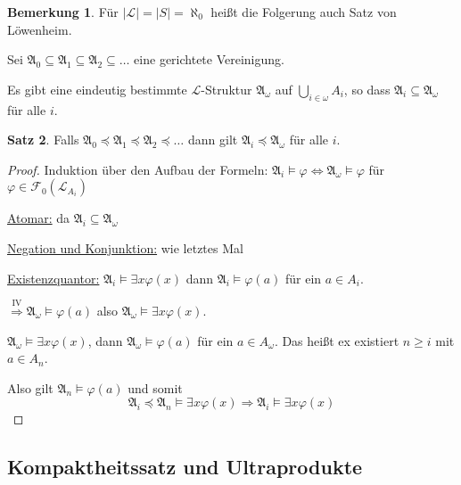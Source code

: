 \documentclass[12pt,parskip=full]{scrartcl}
\newcommand{\abs}[1]{{\left| #1 \right|}}
\newcommand{\heading}{\underline}
\theoremstyle{definition}
\newtheorem{theorem}{Satz}[section]
\newtheorem{remark}[theorem]{Bemerkung}
\begin{document}
	\begin{remark}
		Für $\abs{\mathcal{L}} = \abs{S} = \aleph_0$ heißt die Folgerung auch Satz von Löwenheim.
	\end{remark}

	Sei $\mathfrak{A}_0 \subseteq \mathfrak{A}_1 \subseteq \mathfrak{A}_2 \subseteq \dots$ eine gerichtete Vereinigung.
	
	Es gibt eine eindeutig bestimmte $\mathcal{L}$-Struktur $\mathfrak{A}_\omega$ auf $\bigcup_{i \in \omega} A_i$, so dass $\mathfrak{A}_i \subseteq \mathfrak{A}_\omega$ für alle $i$.
	
	\begin{theorem}
		Falls $\mathfrak{A}_0 \preccurlyeq \mathfrak{A}_1 \preccurlyeq \mathfrak{A}_2 \preccurlyeq \dots$ dann gilt $\mathfrak{A}_i \preccurlyeq \mathfrak{A}_\omega$ für alle $i$.
	\end{theorem}

	\begin{proof}
		Induktion über den Aufbau der Formeln: $\mathfrak{A}_i \models \varphi \Leftrightarrow \mathfrak{A}_\omega \models \varphi$ für $\varphi \in \mathcal{F}_0(\mathcal{L}_{A_i})$
		
		\heading{Atomar:} da $\mathfrak{A}_i \subseteq \mathfrak{A}_\omega$
		
		\heading{Negation und Konjunktion:} wie letztes Mal
		
		\heading{Existenzquantor:} $\mathfrak{A}_i \models \exists x \varphi(x)$ dann $\mathfrak{A}_i \models \varphi(a)$ für ein $a \in A_i$.
		
		$\overset{\text{IV}}{\Rightarrow} \mathfrak{A}_\omega \models \varphi(a)$ also $\mathfrak{A}_\omega \models \exists x \varphi(x)$.
		
		$\mathfrak{A}_\omega \models \exists x \varphi(x)$, dann $\mathfrak{A}_\omega \models \varphi(a)$ für ein $a \in A_\omega$. Das heißt ex existiert $n \geq i$ mit $a \in A_n$.
		
		Also gilt $\mathfrak{A}_n \models \varphi(a)$ und somit
		\begin{equation*}
			\mathfrak{A}_i \preccurlyeq \mathfrak{A}_n \models \exists x \varphi(x) \Rightarrow \mathfrak{A}_i \models \exists x \varphi(x)
		\end{equation*}
	\end{proof}

	\subsection{Kompaktheitssatz und Ultraprodukte}
	
\end{document}
